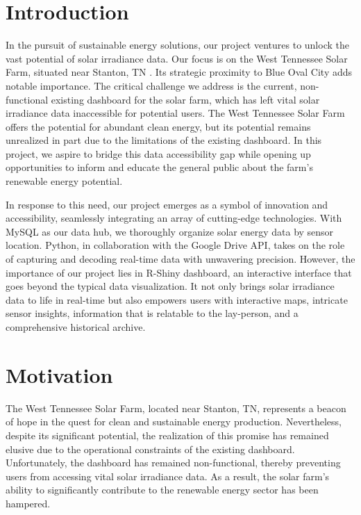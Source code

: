 \documentclass{sigchi}
\begin{document}
\section{Introduction}

In the pursuit of sustainable energy solutions, our project ventures to unlock the vast potential of solar irradiance data. Our focus is on the West Tennessee Solar Farm, situated near Stanton, TN \cite{WTSF}. Its strategic proximity to Blue Oval City adds notable importance. The critical challenge we address is the current, non-functional existing dashboard for the solar farm, which has left vital solar irradiance data inaccessible for potential users. The West Tennessee Solar Farm offers the potential for abundant clean energy, but its potential remains unrealized in part due to the limitations of the existing dashboard. In this project, we aspire to bridge this data accessibility gap while opening up opportunities to inform and educate the general public about the farm's renewable energy potential.

In response to this need, our project emerges as a symbol of innovation and accessibility, seamlessly integrating an array of cutting-edge technologies. With MySQL as our data hub, we thoroughly organize solar energy data by sensor location. Python, in collaboration with the Google Drive API, takes on the role of capturing and decoding real-time data with unwavering precision. However, the importance of our project lies in R-Shiny dashboard, an interactive interface that goes beyond the typical data visualization. It not only brings solar irradiance data to life in real-time but also empowers users with interactive maps, intricate sensor insights, information that is relatable to the lay-person, and a comprehensive historical archive.

\section{Motivation}

The West Tennessee Solar Farm, located near Stanton, TN, represents a beacon of hope in the quest for clean and sustainable energy production. Nevertheless, despite its significant potential, the realization of this promise has remained elusive due to the operational constraints of the existing dashboard. Unfortunately, the dashboard has remained non-functional, thereby preventing users from accessing vital solar irradiance data. As a result, the solar farm's ability to significantly contribute to the renewable energy sector has been hampered.
\end{document}
